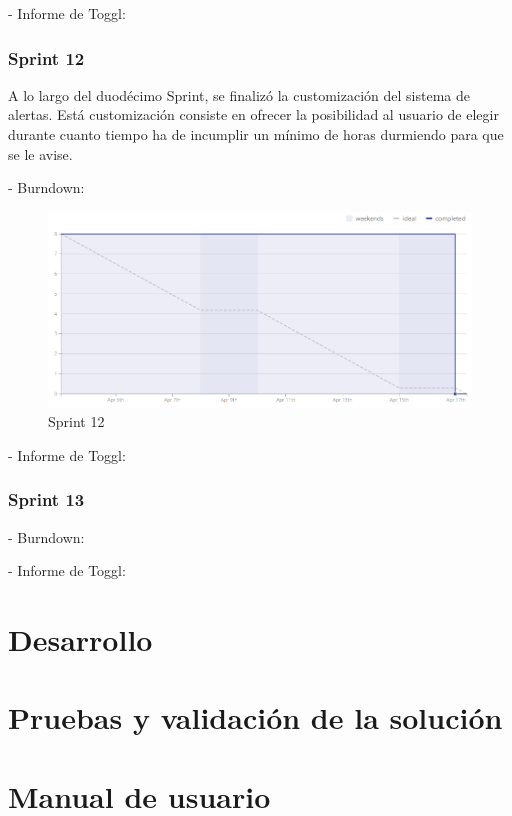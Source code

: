 \documentclass[11pt,openany]{book}
\begin{document}
- Informe de Toggl:

\subsection{Sprint 12}

A lo largo del duodécimo Sprint, se finalizó la customización del sistema de alertas. Está customización consiste en ofrecer la posibilidad al usuario de elegir durante cuanto tiempo ha de incumplir un mínimo de horas durmiendo para que se le avise.

- Burndown:

\begin{figure}[H]
\centering
\includegraphics[totalheight=7cm]{burndowns/Sprint12.png}
\caption{Sprint 12}
\end{figure}

- Informe de Toggl:

\subsection{Sprint 13}

- Burndown:

- Informe de Toggl:

\chapter{Desarrollo}


\chapter{Pruebas y validación de la solución}


\chapter{Manual de usuario}
\end{document}
